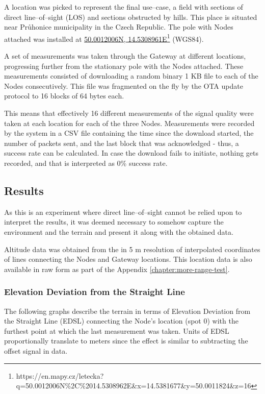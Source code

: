A location was picked to represent the final use--case, a field with sections of direct line--of--sight (LOS) and sections obstructed by hills. This place is situated near Průhonice municipality in the Czech Republic. The pole with Nodes attached was installed at \href{https://en.mapy.cz/letecka?q=50.0012006N%2C%2014.5308962E&x=14.5381677&y=50.0011824&z=16}{50.0012006N, 14.5308961E}\footnote{https://en.mapy.cz/letecka?q=50.0012006N\%2C\%2014.5308962E\&x=14.5381677\&y=50.0011824\&z=16} (WGS84).

A set of measurements was taken through the Gateway at different locations, progressing further from the stationary pole with the Nodes attached. These measurements consisted of downloading a random binary 1 KB file to each of the Nodes consecutively. This file was fragmented on the fly by the OTA update protocol to 16 blocks of 64 bytes each.

This means that effectively 16 different measurements of the signal quality were taken at each location for each of the three Nodes. Measurements were recorded by the system in a CSV file containing the time since the download started, the number of packets sent, and the last block that was acknowledged - thus, a success rate can be calculated. In case the download fails to initiate, nothing gets recorded, and that is interpreted as 0\% success rate.

\subsection{Results}
As this is an experiment where direct line--of--sight cannot be relied upon to interpret the results, it was deemed necessary to somehow capture the environment and the terrain and present it along with the obtained data.

Altitude data was obtained from the  in 5 m resolution of interpolated coordinates of lines connecting the Nodes and Gateway locations. This location data is also available in raw form as part of the Appendix \ref{chapter:more-range-test}.

\subsubsection{\label{section:edsl-definition}Elevation Deviation from the Straight Line}
The following graphs describe the terrain in terms of Elevation Deviation from the Straight Line (EDSL) connecting the Node's location (spot 0) with the furthest point at which the last measurement was taken. Units of EDSL proportionally translate to meters since the effect is similar to subtracting the offset signal in data.

